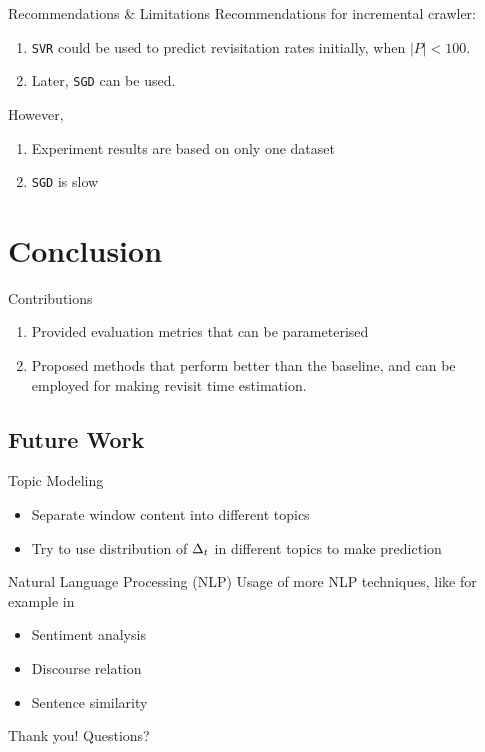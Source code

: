 \documentclass[12pt]{../presentation}
\newcommand{\outpcite}[1]{\textcolor{darkblue}{\outcite{#1}}}
\begin{document}
	\begin{frame}{Recommendations \& Limitations}
Recommendations for incremental crawler:
\begin{enumerate}
\item \texttt{SVR} could be used to predict revisitation rates initially, when $|P| < 100$.
\item Later, \texttt{SGD} can be used.
\end{enumerate}
However,
\begin{enumerate}
	\item Experiment results are based on only one dataset
	\item \texttt{SGD} is slow
\end{enumerate}
\end{frame}

\section{Conclusion}
	\begin{frame}{Contributions}
	\begin{enumerate}
	\item Provided evaluation metrics that can be parameterised
	\item Proposed methods that perform better than the baseline, and can be employed for making revisit time estimation.
	\end{enumerate}
	\end{frame}
	\subsection{Future Work}
	\begin{frame}{Topic Modeling}
		\begin{itemize}
			\item Separate window content into different topics
			\item Try to use distribution of $\Delta_t$ in different topics to make prediction
		\end{itemize}
	\end{frame}
	\begin{frame}{Natural Language Processing (NLP)}
		Usage of more NLP techniques, like for example in \outpcite{Wang}
		\begin{itemize}
			\item Sentiment analysis
			\item Discourse relation
			\item Sentence similarity
		\end{itemize}
	\end{frame}

\begin{frame}
\begin{center}
	\huge
	Thank you! Questions?
\end{center}
\end{frame}


\end{document}
